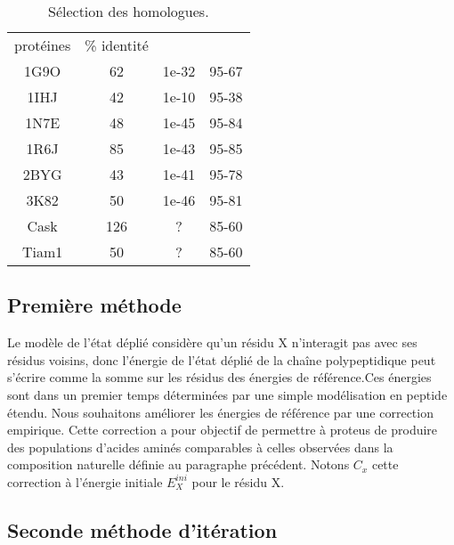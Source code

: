     \clearpage


    \begin{table}[!htbp]
      \centering

      \begin{tabular}{cccc}

        \toprule
        protéines & \% identité \\
        \cmidrule{1-4}
     1G9O  & 62  &    1e-32  &  95-67 \\
     1IHJ  & 42  &    1e-10  &  95-38 \\
     1N7E  & 48  &    1e-45  &  95-84 \\
     1R6J  & 85  &    1e-43  &  95-85 \\
     2BYG  & 43  &    1e-41  &  95-78 \\
     3K82  & 50  &    1e-46  &  95-81 \\
     Cask  & 126 &    ?      &  85-60 \\
     Tiam1 & 50  &    ?      &  85-60 \\

        \bottomrule

      \end{tabular}      
      \caption{Sélection des homologues.}
\label{tab:select_homo}      
    \end{table}





    \clearpage



\subsection{Première méthode}

Le modèle de l'état déplié considère qu'un résidu X n’interagit pas avec ses résidus voisins, donc l'énergie de l'état déplié de la chaîne polypeptidique peut s'écrire comme la somme sur les résidus des énergies de référence.Ces énergies sont dans un premier temps déterminées par une simple modélisation en peptide étendu.
 Nous souhaitons améliorer les énergies de référence par une correction empirique. Cette correction a pour objectif de permettre à proteus de produire des populations d'acides aminés comparables à celles observées dans la composition naturelle définie au paragraphe précédent.
Notons $C_x$ cette correction à l'énergie initiale $E_X^{ini}$ pour le résidu X.




\subsection{Seconde méthode d'itération}

